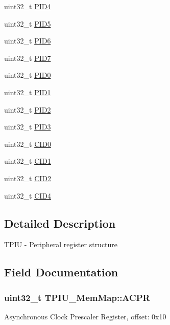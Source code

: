 \begin{DoxyCompactItemize}
\item 
uint32\+\_\+t \hyperlink{struct_t_p_i_u___mem_map_ad70cfe6551cef4070f3f838a9a66c821}{P\+I\+D4}
\item 
uint32\+\_\+t \hyperlink{struct_t_p_i_u___mem_map_a538891793ff7ccfae685d49a0603dc77}{P\+I\+D5}
\item 
uint32\+\_\+t \hyperlink{struct_t_p_i_u___mem_map_a185d2c4d405ba5af792d84b79491b64c}{P\+I\+D6}
\item 
uint32\+\_\+t \hyperlink{struct_t_p_i_u___mem_map_a1b71c0dea2679488ce2ba937ed68597a}{P\+I\+D7}
\item 
uint32\+\_\+t \hyperlink{struct_t_p_i_u___mem_map_a8cf104c851fc40c954ff97ddff1d8d3b}{P\+I\+D0}
\item 
uint32\+\_\+t \hyperlink{struct_t_p_i_u___mem_map_a2f7285e167ba972adc7d760671b6cd94}{P\+I\+D1}
\item 
uint32\+\_\+t \hyperlink{struct_t_p_i_u___mem_map_a9c86b62f691869178b490b1641d83afe}{P\+I\+D2}
\item 
uint32\+\_\+t \hyperlink{struct_t_p_i_u___mem_map_abf0fc2738afe793c35be489ddee5c0e0}{P\+I\+D3}
\item 
uint32\+\_\+t \hyperlink{struct_t_p_i_u___mem_map_a396bb8a0f5c7a9494f0cd0973e8a141d}{C\+I\+D0}
\item 
uint32\+\_\+t \hyperlink{struct_t_p_i_u___mem_map_afa92c6c4b400339e646d717e30b505b7}{C\+I\+D1}
\item 
uint32\+\_\+t \hyperlink{struct_t_p_i_u___mem_map_a3b613f265bf4b8c679e4da5f002eb4cd}{C\+I\+D2}
\item 
uint32\+\_\+t \hyperlink{struct_t_p_i_u___mem_map_ae113185bb92abeaaa996a345b28d33a8}{C\+I\+D4}
\end{DoxyCompactItemize}


\subsection{Detailed Description}
T\+P\+I\+U -\/ Peripheral register structure 

\subsection{Field Documentation}
\hypertarget{struct_t_p_i_u___mem_map_a007e503f472f605b40c6f7425e4bdf77}{}
\subsubsection[{A\+C\+P\+R}]{\setlength{\rightskip}{0pt plus 5cm}uint32\+\_\+t T\+P\+I\+U\+\_\+\+Mem\+Map\+::\+A\+C\+P\+R}\label{struct_t_p_i_u___mem_map_a007e503f472f605b40c6f7425e4bdf77}
Asynchronous Clock Prescaler Register, offset\+: 0x10 \hypertarget{struct_t_p_i_u___mem_map_a396bb8a0f5c7a9494f0cd0973e8a141d}{}
